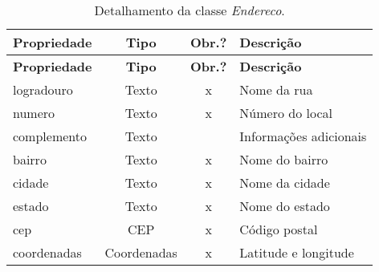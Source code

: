 \begin{longtable}{|p{3.5cm}|c|c|p{8cm}|}
    \caption{Detalhamento da classe \emph{Endereco}.}
    \label{tbl-dicionario-endereco} \\\hline 
    
    \rowcolor{lightgray}
    \textbf{Propriedade} & \textbf{Tipo} & \textbf{Obr.?} & \textbf{Descrição} \\\hline
    \endfirsthead
    \hline
    \rowcolor{lightgray}
    \textbf{Propriedade} & \textbf{Tipo} & \textbf{Obr.?} & \textbf{Descrição} \\\hline
    \endhead
    
    logradouro & Texto & x & Nome da rua \\\hline
    numero & Texto & x & Número do local \\\hline
    complemento & Texto & & Informações adicionais \\\hline
    bairro & Texto & x & Nome do bairro \\\hline
    cidade & Texto & x & Nome da cidade \\\hline
    estado & Texto & x & Nome do estado \\\hline
    cep & CEP & x & Código postal \\\hline
    coordenadas & Coordenadas & x & Latitude e longitude \\\hline
\end{longtable}

